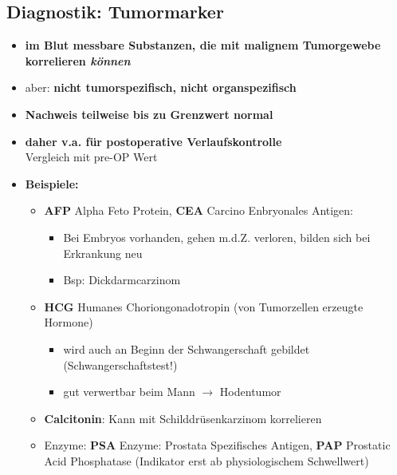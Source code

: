 	\subsection{Diagnostik: Tumormarker}
		\begin{itemize}
			\item \textbf{im Blut messbare Substanzen, die mit malignem
				Tumorgewebe korrelieren \emph{können}}
			\item aber: \textbf{nicht tumorspezifisch, nicht organspezifisch}
			\item \textbf{Nachweis teilweise bis zu Grenzwert normal}
			\item \textbf{daher v.a. für postoperative Verlaufskontrolle}\\
				Vergleich mit pre-OP Wert
			\item \textbf{Beispiele:}
				\begin{itemize}
					\item \textbf{AFP} Alpha Feto Protein, \textbf{CEA} Carcino Enbryonales Antigen:
						\begin{itemize}
							\item Bei Embryos vorhanden, gehen m.d.Z. verloren, bilden sich bei Erkrankung neu
							\item Bsp: Dickdarmcarzinom
						\end{itemize}
					\item \textbf{HCG} Humanes Choriongonadotropin (von Tumorzellen erzeugte Hormone)
						\begin{itemize}
							\item wird auch an Beginn der Schwangerschaft gebildet (Schwangerschaftstest!)
							\item gut verwertbar beim Mann $\rightarrow$ Hodentumor
						\end{itemize}
					\item \textbf{Calcitonin}: Kann mit Schilddrüsenkarzinom korrelieren
					\item Enzyme: \textbf{PSA} Enzyme: Prostata Spezifisches Antigen, \textbf{PAP} Prostatic Acid Phosphatase (Indikator erst ab physiologischem Schwellwert)
				\end{itemize}
		\end{itemize}
